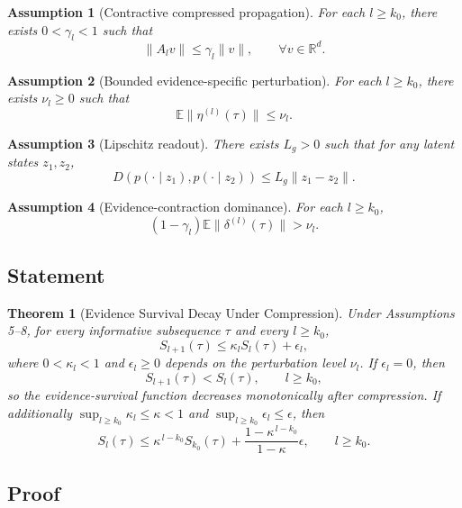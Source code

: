 \documentclass[11pt]{article}
\newtheorem{theorem}{Theorem}
\newtheorem{assumption}{Assumption}
\newcommand{\R}{\mathbb{R}}
\newcommand{\E}{\mathbb{E}}
\begin{document}
\begin{assumption}[Contractive compressed propagation]
For each $l \ge k_0$, there exists $0<\gamma_l<1$ such that
\[
\|A_l v\| \le \gamma_l \|v\|,
\qquad \forall v \in \R^d.
\]
\end{assumption}

\begin{assumption}[Bounded evidence-specific perturbation]
For each $l \ge k_0$, there exists $\nu_l \ge 0$ such that
\[
\E\|\eta^{(l)}(\tau)\| \le \nu_l.
\]
\end{assumption}

\begin{assumption}[Lipschitz readout]
There exists $L_g>0$ such that for any latent states $z_1,z_2$,
\[
D\!\left(p(\cdot\mid z_1), p(\cdot\mid z_2)\right)
\le
L_g \|z_1 - z_2\|.
\]
\end{assumption}

\begin{assumption}[Evidence-contraction dominance]
For each $l \ge k_0$,
\[
(1-\gamma_l)\E\|\delta^{(l)}(\tau)\| > \nu_l.
\]
\end{assumption}

\subsection{Statement}

\begin{theorem}[Evidence Survival Decay Under Compression]
Under Assumptions 5--8, for every informative subsequence $\tau$ and every $l \ge k_0$,
\[
S_{l+1}(\tau) \le \kappa_l S_l(\tau) + \epsilon_l,
\]
where $0<\kappa_l<1$ and $\epsilon_l \ge 0$ depends on the perturbation level $\nu_l$.
If $\epsilon_l=0$, then
\[
S_{l+1}(\tau) < S_l(\tau),
\qquad l \ge k_0,
\]
so the evidence-survival function decreases monotonically after compression.
If additionally $\sup_{l\ge k_0}\kappa_l \le \kappa <1$ and $\sup_{l\ge k_0}\epsilon_l \le \epsilon$, then
\[
S_l(\tau)
\le
\kappa^{\,l-k_0} S_{k_0}(\tau)
+
\frac{1-\kappa^{\,l-k_0}}{1-\kappa}\epsilon,
\qquad l \ge k_0.
\]
\end{theorem}

\subsection{Proof}
\end{document}
